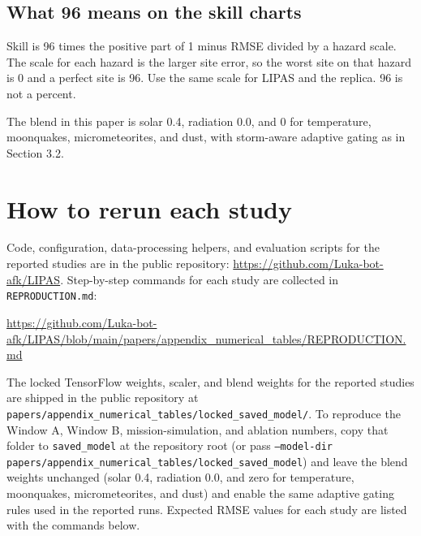 \subsection*{What 96 means on the skill charts}
Skill is 96 times the positive part of 1 minus RMSE divided by a hazard scale. The scale for each hazard is the larger site error, so the worst site on that hazard is 0 and a perfect site is 96. Use the same scale for LIPAS and the replica. 96 is not a percent.

The blend in this paper is solar 0.4, radiation 0.0, and 0 for temperature, moonquakes, micrometeorites, and dust, with storm-aware adaptive gating as in Section 3.2.

\section{How to rerun each study}

Code, configuration, data-processing helpers, and evaluation scripts for the reported studies are in the public repository: \url{https://github.com/Luka-bot-afk/LIPAS}. Step-by-step commands for each study are collected in \texttt{REPRODUCTION.md}:

\url{https://github.com/Luka-bot-afk/LIPAS/blob/main/papers/appendix_numerical_tables/REPRODUCTION.md}

The locked TensorFlow weights, scaler, and blend weights for the reported studies are shipped in the public repository at \texttt{papers/appendix\_numerical\_tables/locked\_saved\_model/}. To reproduce the Window A, Window B, mission-simulation, and ablation numbers, copy that folder to \texttt{saved\_model} at the repository root (or pass \texttt{--model-dir papers/appendix\_numerical\_tables/locked\_saved\_model}) and leave the blend weights unchanged (solar 0.4, radiation 0.0, and zero for temperature, moonquakes, micrometeorites, and dust) and enable the same adaptive gating rules used in the reported runs. Expected RMSE values for each study are listed with the commands below.

